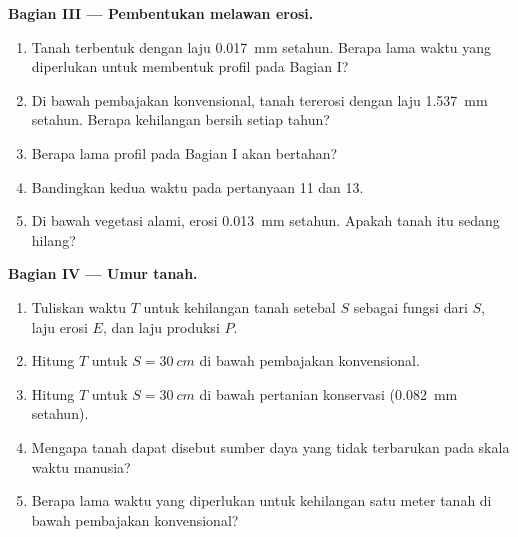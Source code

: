 \begin{problem}
\medskip
\noindent\textbf{Bagian III --- Pembentukan melawan erosi.}
\begin{enumerate}[resume]
  \item Tanah terbentuk dengan laju \qty{0.017}{mm} setahun. Berapa lama
        waktu yang diperlukan untuk membentuk profil pada Bagian I?
  \item Di bawah pembajakan konvensional, tanah tererosi dengan laju
        \qty{1.537}{mm} setahun. Berapa kehilangan bersih setiap tahun?
  \item Berapa lama profil pada Bagian I akan bertahan?
  \item Bandingkan kedua waktu pada pertanyaan 11 dan 13.
  \item Di bawah vegetasi alami, erosi \qty{0.013}{mm} setahun. Apakah tanah
        itu sedang hilang?
\end{enumerate}

\medskip
\noindent\textbf{Bagian IV --- Umur tanah.}
\begin{enumerate}[resume]
  \item Tuliskan waktu $T$ untuk kehilangan tanah setebal $S$ sebagai fungsi
        dari $S$, laju erosi $E$, dan laju produksi $P$.
  \item Hitung $T$ untuk $S = \qty{30}{cm}$ di bawah pembajakan
        konvensional.
  \item Hitung $T$ untuk $S = \qty{30}{cm}$ di bawah pertanian konservasi
        (\qty{0.082}{mm} setahun).
  \item Mengapa tanah dapat disebut sumber daya yang tidak terbarukan pada
        skala waktu manusia?
  \item Berapa lama waktu yang diperlukan untuk kehilangan satu meter tanah di
        bawah pembajakan konvensional?
\end{enumerate}
\end{problem}
